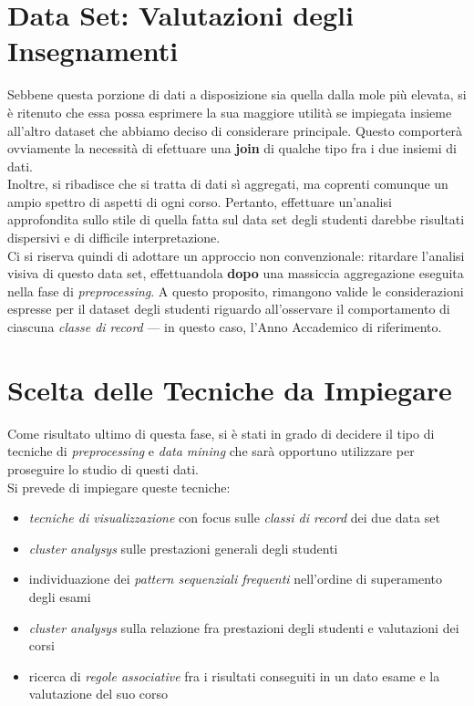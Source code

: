     \section{Data Set: Valutazioni degli Insegnamenti}

        Sebbene questa porzione di dati a disposizione sia quella dalla mole più elevata, si è ritenuto che essa possa esprimere la sua maggiore utilità se impiegata insieme all'altro dataset che abbiamo deciso di considerare principale. Questo comporterà ovviamente la necessità di efettuare una \textbf{join} di qualche tipo fra i due insiemi di dati.\\
        
        Inoltre, si ribadisce che si tratta di dati sì aggregati, ma coprenti comunque un ampio spettro di aspetti di ogni corso. Pertanto, effettuare un'analisi approfondita sullo stile di quella fatta sul data set degli studenti darebbe risultati dispersivi e di difficile interpretazione. \\

        Ci si riserva quindi di adottare un approccio non convenzionale: ritardare l'analisi visiva di questo data set, effettuandola \textbf{dopo} una massiccia aggregazione eseguita nella fase di \textit{preprocessing}. A questo proposito, rimangono valide le considerazioni espresse per il dataset degli studenti riguardo all'osservare il comportamento di ciascuna \textit{classe di record} --- in questo caso, l'Anno Accademico di riferimento.

    \section{Scelta delle Tecniche da Impiegare}

        Come risultato ultimo di questa fase, si è stati in grado di decidere il tipo di tecniche di \textit{preprocessing} e \textit{data mining} che sarà opportuno utilizzare per proseguire lo studio di questi dati. \\

        Si prevede di impiegare queste tecniche:

        \begin{itemize}
            \item \textit{tecniche di visualizzazione} con focus sulle \textit{classi di record} dei due data set
            \item \textit{cluster analysys} sulle prestazioni generali degli studenti
            \item individuazione dei \textit{pattern sequenziali frequenti} nell'ordine di superamento degli esami
            \item \textit{cluster analysys} sulla relazione fra prestazioni degli studenti e valutazioni dei corsi
            \item ricerca di \textit{regole associative} fra i risultati conseguiti in un dato esame e la valutazione del suo corso
        \end{itemize}

